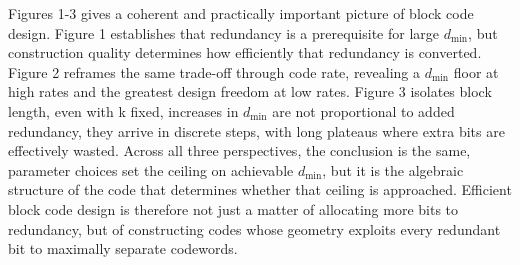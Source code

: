 \documentclass{article}
\begin{document}
Figures 1-3 gives a coherent and practically important picture of block code design. Figure 1 establishes that 
redundancy is a prerequisite for large \(d_\text{min}\), but construction quality determines how efficiently that 
redundancy is converted. Figure 2 reframes the same trade-off through code rate, revealing a \(d_\text{min}\)
floor at high rates and the greatest design freedom at low rates. Figure 3 isolates block length, even with k fixed,
increases in \(d_\text{min}\) are not proportional to added redundancy, they arrive in discrete steps, with long 
plateaus where extra bits are effectively wasted. Across all three perspectives, the conclusion is the same, parameter 
choices set the ceiling on achievable \(d_\text{min}\), but it is the algebraic structure of the code that determines 
whether that ceiling is approached. Efficient block code design is therefore not just a matter of allocating more 
bits to redundancy, but of constructing codes whose geometry exploits every redundant bit to maximally separate 
codewords.

\newpage
\centering
\printbibliography

\appendix
\end{document}
